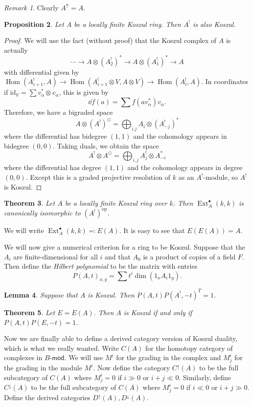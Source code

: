 \documentclass{amsart}
\newtheorem{thm}{Theorem}[section]
\newtheorem{prop}[thm]{Proposition}
\newtheorem{lem}[thm]{Lemma}
\theoremstyle{definition}
\theoremstyle{remark}
\newtheorem{rmk}[thm]{Remark}
\theoremstyle{plain}
\theoremstyle{definition}
\theoremstyle{remark}
\newcommand{\mr}[1]{\mathrm{#1}}
\newcommand{\ms}[1]{\mathsf{#1}}
\DeclareMathOperator{\Hom}{Hom}
\DeclareMathOperator{\Ext}{Ext}
\begin{document}
\begin{rmk}
    Clearly $A^{!!} = A$.
\end{rmk}

\begin{prop}
    Let $A$ be a locally finite Koszul ring. Then $A^!$ is also Koszul.
\end{prop}

\begin{proof}
    We will use the fact (without proof) that the Koszul complex of $A$ is actually
    \[ \cdots \to A \otimes (A_2^!)^* \to A \otimes (A_1^!)^* \to A \]
    with differential given by $\Hom(A_{i+1}^!, A) \to \Hom(A_{i+1}^! \otimes V, A \otimes V) \to \Hom(A_i^!, A)$. 
    In coordinates if $\mr{id}_V = \sum v_{\alpha}^* \otimes v_{\alpha}$, this is given by
    \[ \dd{f}(a) = \sum f(a v_{\alpha}^*) v_{\alpha}. \]
    Therefore, we have a bigraded space
    \[ A \otimes (A^!)^{\odot} = \bigoplus_{i.j} A_i \otimes (A_{-j}^!)^* \]
    where the differential has bidegree $(1,1)$ and the cohomology appears in bidegree $(0,0)$. Taking duals, we obtain the space
    \[ A^! \otimes A^{\odot} = \bigoplus_{i,j} A_j^! \otimes A_{-i}^* \]
    where the differential has degree $(1,1)$ and the cohomology appears in degree $(0,0)$. Except this is a graded projective resolution of $k$ as an $A^!$-module, so $A^!$ is Koszul.
\end{proof}

\begin{thm}
    Let $A$ be a locally finite Koszul ring over $k$. Then $\Ext_A^{\bullet}(k, k)$ is canonically isomorphic to $(A^!)^{\mr{op}}$.
\end{thm}
We will write $\Ext_A^{\bullet}(k, k) \eqqcolon E(A)$. It is easy to see that $E(E(A)) = A$. 

We will now give a numerical criterion for a ring to be Koszul. Suppose that the $A_i$ are finite-dimensional for all $i$ and that $A_0$ is a product of copies of a field $F$. Then define the \textit{Hilbert polynomial} to be the matrix with entries
\[ P(A, t)_{x,y} = \sum t^i \dim (1_x A_i 1_y). \]

\begin{lem}
    Suppose that $A$ is Koszul. Then $P(A,t)P(A^!, -t)^T = 1$.
\end{lem}

\begin{thm}
    Let $E = E(A)$. Then $A$ is Koszul if and only if $P(A, t)P(E, -t) = 1$.
\end{thm}

Now we are finally able to define a derived category version of Koszul duality, which is what we really wanted. Write $C(A)$ for the homotopy category of complexes in $B\text{-}\ms{mod}$. We will use $M^i$ for the grading in the complex and $M^i_j$ for the grading in the module $M^i$. Now define the category $C^{\uparrow}(A)$ to be the full subcategory of $C(A)$ where $M_j^i = 0$ if $i \gg 0$ or $i + j \ll 0$. Similarly, define $C^{\downarrow}(A)$ to be the full subcategory of $C(A)$ where $M_j^i = 0$ if $i \ll 0$ or $i + j \gg 0$. Define the derived categories $D^{\uparrow}(A), D^{\downarrow}(A)$.
\end{document}
